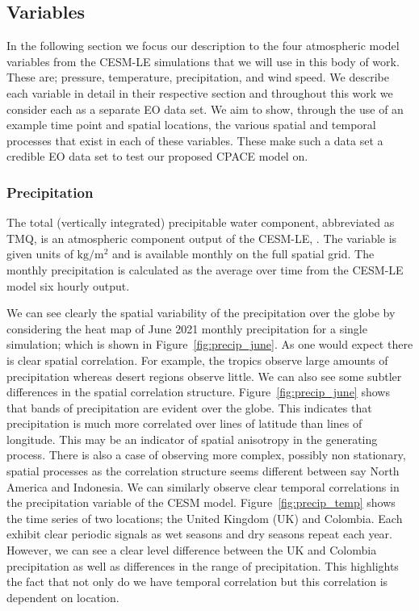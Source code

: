  \subsection{Variables \label{ssec:variables}}
 In the following section we focus our description to the four atmospheric model variables from the  CESM-LE simulations that we will use in this body of work.
 These are; pressure, temperature, precipitation, and wind speed.
 We describe each variable in detail in their respective section and throughout this work we consider each as a separate EO data set.
 We aim to show, through the use of an example time point and spatial locations, the various spatial and temporal processes that exist in each of these variables.
 These make such a data set a credible EO data set to test our proposed CPACE model on. 

\subsubsection{Precipitation \label{sssec:precip}}
The total (vertically integrated) precipitable water component, abbreviated as TMQ, is an atmospheric component output of the CESM-LE, \citep{kay_community_2015}.
The variable is given units of $\si{\kilogram\per\metre\squared} $ and is available monthly on the full spatial grid.
The monthly precipitation is calculated as the average over time from the  CESM-LE model six hourly output. 

We can see clearly the spatial variability of the precipitation over the globe by considering the heat map of June 2021 monthly precipitation for a single simulation; which is shown in Figure~\ref{fig:precip_june}. 
As one would expect there is clear spatial correlation.
For example, the tropics observe large amounts of precipitation whereas desert regions observe little. 
We can also see some subtler differences in the spatial correlation structure. 
Figure~\ref{fig:precip_june} shows that bands of precipitation are evident over the globe.
This indicates that precipitation is much more correlated over lines of latitude than lines of longitude. 
This may be an indicator of spatial anisotropy in the generating process.
There is also a case of observing more complex, possibly non stationary, spatial processes as the correlation structure seems different between say North America and Indonesia. 
We can similarly observe clear temporal correlations in the precipitation variable of the CESM model.
Figure~\ref{fig:precip_temp} shows the time series of two locations; the United Kingdom (UK) and Colombia.
Each exhibit clear periodic signals as wet seasons and dry seasons repeat each year.
However, we can see a clear level difference between the UK and Colombia precipitation as well as differences in the range of precipitation.
This highlights the fact that not only do we have temporal correlation but this correlation is dependent on location. 

